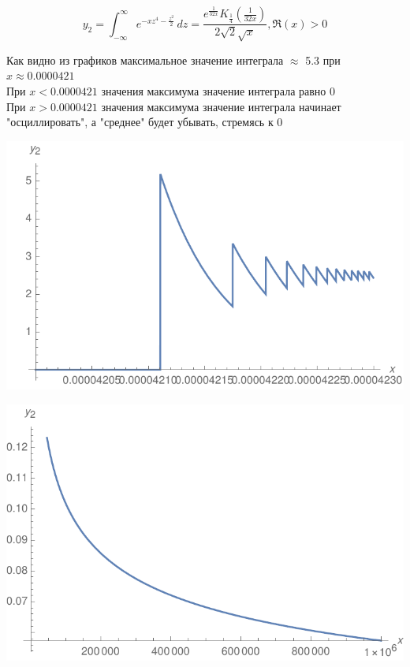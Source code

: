 \documentclass[a4paper,14pt]{article}
\begin{document}
\begin{equation}
y_2 = \int_{-\infty }^{\infty } e^{-x z^4-\frac{z^2}{2}} \, dz = \frac{e^{\frac{1}{32 x}} K_{\frac{1}{4}}\left(\frac{1}{32 x}\right)}{2 \sqrt{2} \sqrt{x}},\Re(x)>0
\end{equation} 

Как видно из графиков максимальное значение интеграла $\approx$ 5.3 при $x\approx 0.0000421$\\
При $x<0.0000421$ значения максимума значение интеграла равно 0\\
При $x>0.0000421$ значения максимума значение интеграла начинает "осциллировать", а "среднее" будет убывать, стремясь к 0

\begin{center}
\includegraphics{gr4}
\end{center}

\begin{center}
\includegraphics{gr5}
\end{center}
\end{document}
